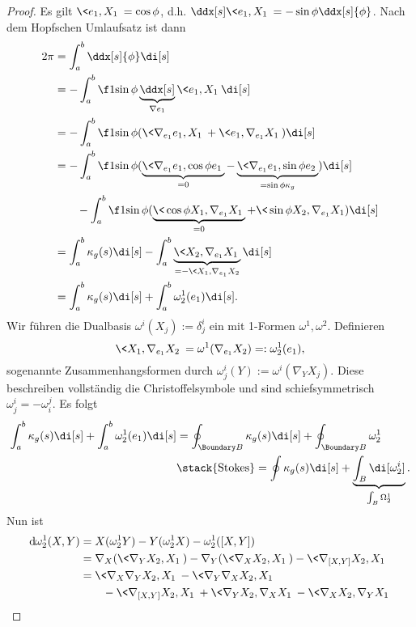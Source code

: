\begin{thm}
\begin{proof}
		Es gilt $\<e_1, X_1\> = \cos \phi$, d.h. $\ddx[s] \<e_1, X_1\> = -\sin \phi \ddx[s]{\phi}$.
		Nach dem Hopfschen Umlaufsatz ist dann
		\begin{align*}
			2\pi
			&= \int_a^b \ddx[s]{\phi} \di[s] \\
			&= - \int_a^b \f 1{\sin \phi} \underbrace{\ddx[s]}_{\nabla e_1} \<e_1, X_1\> \di[s] \\
			&= - \int_a^b \f 1{\sin \phi} (\<\nabla_{e_1} e_1, X_1\> + \< e_1, \nabla_{e_1} X_1\>) \di[s] \\
			&= - \int_a^b \f 1{\sin \phi} (\underbrace{\<\nabla_{e_1} e_1, \cos \phi e_1\>}_{=0} - \underbrace{\< \nabla_{e_1} e_1, \sin \phi e_2\>}_{=\sin \phi \kappa_g}) \di[s] \\
			& \qquad  - \int_a^b \f 1{\sin \phi} (\underbrace{\<\cos \phi X_1, \nabla_{e_1} X_1\>}_{=0} + \< \sin \phi X_2, \nabla_{e_1} X_1) \di[s] \\
			&= \int_a^b \kappa_g(s) \di[s] - \int_a^b \underbrace{\<X_2, \nabla_{e_1} X_1\>}_{= -\<X_1, \nabla_{e_1} X_2} \di[s] \\
			&= \int_a^b \kappa_g(s) \di[s] + \int_a^b \omega_2^1(e_1) \di[s].
		\end{align*}
		Wir führen die Dualbasis $\omega^i(X_j) := \delta_j^i$ ein mit 1-Formen $\omega^1, \omega^2$.
		Definieren
		\[
			\<X_1, \nabla_{e_1} X_2\>
			= \omega^1(\nabla_{e_1} X_2)
			=: \omega_2^1(e_1),
		\]
		sogenannte Zusammenhangsformen durch
		$\omega_j^i(Y) := \omega^i(\nabla_Y X_j)$.
		Diese beschreiben vollständig die Christoffelsymbole und sind schiefsymmetrisch $\omega_j^i = - \omega_i^j$.
		Es folgt
		\begin{align*}
			\int_a^b \kappa_g(s) \di[s] + \int_a^b \omega_2^1(e_1) \di[s]
			&= \oint_{\Boundary B} \kappa_g(s) \di[s] + \oint_{\Boundary B} \omega_2^1 \\
			&\stack{\text{Stokes}}= \oint \kappa_g(s) \di[s] + \underbrace{\int_{B} \di[\omega_2^i]}_{\int_B \Omega_2^1}.
		\end{align*}
		Nun ist
		\begin{align*}
			\dx[\omega_2^1](X, Y)
			&= X(\omega_2^1 Y) - Y(\omega_2^1 X) - \omega_2^1([X,Y]) \\
			&= \nabla_X(\<\nabla_Y X_2, X_1\>) - \nabla_Y(\<\nabla_X X_2, X_1\>) - \< \nabla_{[X,Y]} X_2, X_1\> \\
			&= \< \nabla_X \nabla_Y X_2, X_1\> - \< \nabla_Y \nabla_X X_2, X_1\> \\
			&\qquad - \< \nabla_{[X,Y]} X_2, X_1\> + \< \nabla_Y X_2, \nabla_X X_1\> - \< \nabla_X X_2, \nabla_Y X_1\> \\

\end{align*}
\end{proof}
\end{thm}
